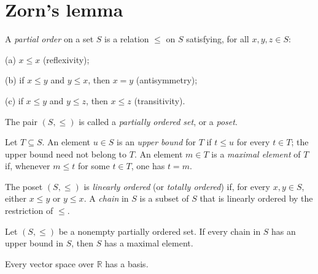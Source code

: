 \appendix
\section{Zorn's lemma}

\begin{de}
A \emph{partial order} on a set $S$ is a relation $\leq$ on $S$ satisfying,
for all $x,y,z\in S$:

(a) $x\leq x$ (reflexivity);

(b) if $x\leq y$ and $y\leq x$, then $x=y$ (antisymmetry);

(c) if $x\leq y$ and $y\leq z$, then $x\leq z$ (transitivity).

The pair $(S,\leq)$ is called a \emph{partially ordered set}, or a
\emph{poset}.

Let $T\subseteq S$. An element $u\in S$ is an \emph{upper bound} for $T$ if
$t\leq u$ for every $t\in T$; the upper bound need not belong to $T$.
An element $m\in T$ is a \emph{maximal element} of $T$ if, whenever
$m\leq t$ for some $t\in T$, one has $t=m$.

The poset $(S,\leq)$ is \emph{linearly ordered} (or \emph{totally ordered})
if, for every $x,y\in S$, either $x\leq y$ or $y\leq x$. A \emph{chain} in
$S$ is a subset of $S$ that is linearly ordered by the restriction of
$\leq$.
\end{de}

\begin{thm}
Let $(S,\leq)$ be a nonempty partially ordered set. If every chain in $S$
has an upper bound in $S$, then $S$ has a maximal element.
\end{thm}

\begin{thm}
Every vector space over $\mathbb{R}$ has a basis.
\end{thm}


